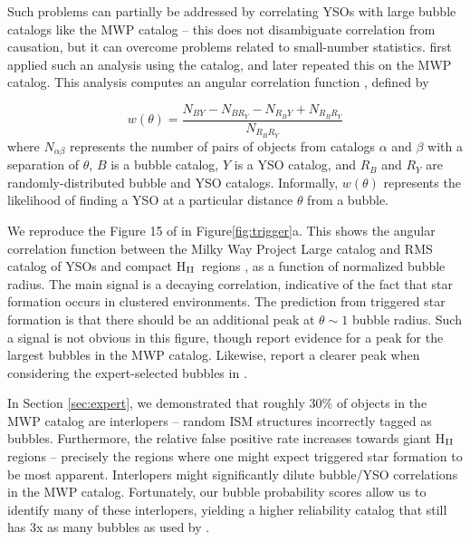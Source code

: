 \documentclass[preprint]{aastex}
\newcommand{\hii}[0]{H$_{\rm II}$}
\begin{document}
Such problems can partially be addressed by correlating YSOs with large bubble catalogs like the MWP catalog -- this does not disambiguate correlation from causation, but it can overcome problems related to small-number statistics. \cite{Thompson12} first applied such an analysis using the \cite{Churchwell06} catalog, and \cite{Kendrew12} later repeated this on the MWP catalog. This analysis computes an angular correlation function \citep{Landy93, Bradshaw11}, defined by

\begin{equation}
w(\theta) = \frac{N_{BY} - N_{BR_Y} - N_{R_BY} + N_{R_BR_Y}}{N_{R_BR_Y}}
\label{eq:corr}
\end{equation}
where $N_{\alpha \beta}$ represents the number of pairs of objects from catalogs $\alpha$ and $\beta$ with a separation of $\theta$, $B$ is a bubble catalog, $Y$ is a YSO catalog, and $R_B$ and $R_Y$ are randomly-distributed bubble and YSO catalogs. Informally, $w(\theta)$ represents the likelihood of finding a YSO at a particular distance $\theta$ from a bubble. 

We reproduce the Figure 15 of \cite{Kendrew12} in Figure\ref{fig:trigger}a. This shows the angular correlation function between the Milky Way Project Large catalog and RMS catalog of YSOs and compact \hii\, regions \citep{RMS}, as a function of normalized bubble radius. The main signal is a decaying correlation, indicative of the fact that star formation occurs in clustered environments. The prediction from triggered star formation is that there should be an additional peak at $\theta \sim 1$ bubble radius. Such a signal is not obvious in this figure, though \cite{Kendrew12} report evidence for a peak for the largest bubbles in the MWP catalog. Likewise, \cite{Thompson12} report a clearer peak when considering the expert-selected bubbles in \cite{Churchwell06}. 

In Section \ref{sec:expert}, we demonstrated that roughly 30\% of objects in the MWP catalog are interlopers -- random ISM structures incorrectly tagged as bubbles. Furthermore, the relative false positive rate increases towards giant \hii\, regions -- precisely the regions where one might expect triggered star formation to be most apparent. Interlopers might significantly dilute bubble/YSO correlations in the MWP catalog. Fortunately, our bubble probability scores allow us to identify many of these interlopers, yielding a higher reliability catalog that still has 3x as many bubbles as used by \cite{Thompson12}.
\end{document}
